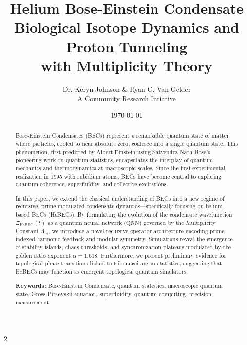 \documentclass{article}
\theoremstyle{plain}
\begin{document}
\title{Helium Bose-Einstein Condensate \\ \large Biological Isotope Dynamics and Proton Tunneling\\with Multiplicity Theory}
\author{Dr. Keryn Johnson \& Ryan O. Van Gelder \\ A Community Research Intiative}
\date{\today}

\maketitle
\begin{abstract}
Bose-Einstein Condensates (BECs) represent a remarkable quantum state of matter where particles, cooled to near absolute zero, coalesce into a single quantum state. This phenomenon, first predicted by Albert Einstein using Satyendra Nath Bose’s pioneering work on quantum statistics, encapsulates the interplay of quantum mechanics and thermodynamics at macroscopic scales. Since the first experimental realization in 1995 with rubidium atoms, BECs have become central to exploring quantum coherence, superfluidity, and collective excitations.

In this paper, we extend the classical understanding of BECs into a new regime of recursive, prime-modulated condensate dynamics—specifically focusing on helium-based BECs (HeBECs). By formulating the evolution of the condensate wavefunction \(\Xi_{\text{HeBEC}}(t)\) as a quantum neural network (QNN) governed by the Multiplicity Constant \(\Lambda_m\), we introduce a novel recursive operator architecture encoding prime-indexed harmonic feedback and modular symmetry. Simulations reveal the emergence of stability islands, chaos thresholds, and synchronization plateaus modulated by the golden ratio exponent \(\alpha = 1.618\). Furthermore, we present preliminary evidence for topological phase transitions linked to Fibonacci anyon statistics, suggesting that HeBECs may function as emergent topological quantum simulators.

\textbf{Keywords:} Bose-Einstein Condensate, quantum statistics, macroscopic quantum state, Gross-Pitaevskii equation, superfluidity, quantum computing, precision measurement
\end{abstract}
\newpage
\begin{multicols}{2}
\begin{singlespace}
\tableofcontents
\end{singlespace}
\end{multicols}
\end{document}
